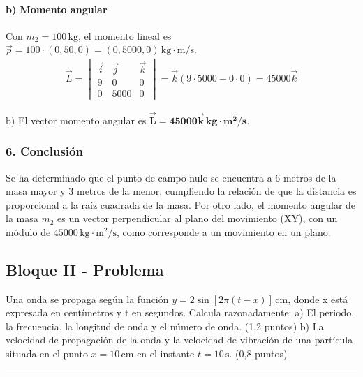 \paragraph{b) Momento angular}
Con $m_2=100\,\text{kg}$, el momento lineal es $\vec{p} = 100 \cdot (0,50,0) = (0, 5000, 0)\,\text{kg}\cdot\text{m/s}$.
\begin{gather}
    \vec{L} = \begin{vmatrix} \vec{i} & \vec{j} & \vec{k} \\ 9 & 0 & 0 \\ 0 & 5000 & 0 \end{vmatrix} = \vec{k}(9 \cdot 5000 - 0 \cdot 0) = 45000\vec{k}
\end{gather}
\begin{cajaresultado}
b) El vector momento angular es $\boldsymbol{\vec{L} = 45000\vec{k}\,\textbf{kg}\cdot\textbf{m}^2/\textbf{s}}$.
\end{cajaresultado}

\subsubsection*{6. Conclusión}
\begin{cajaconclusion}
Se ha determinado que el punto de campo nulo se encuentra a 6 metros de la masa mayor y 3 metros de la menor, cumpliendo la relación de que la distancia es proporcional a la raíz cuadrada de la masa. Por otro lado, el momento angular de la masa $m_2$ es un vector perpendicular al plano del movimiento (XY), con un módulo de $45000\,\text{kg}\cdot\text{m}^2/\text{s}$, como corresponde a un movimiento en un plano.
\end{cajaconclusion}

\newpage

\subsection{Bloque II - Problema}
\label{subsec:B2_2014_jul_ext}

\begin{cajaenunciado}
Una onda se propaga según la función $y=2\sin[2\pi(t-x)]\,\text{cm}$, donde x está expresada en centímetros y t en segundos. Calcula razonadamente:
a) El periodo, la frecuencia, la longitud de onda y el número de onda. (1,2 puntos) 
b) La velocidad de propagación de la onda y la velocidad de vibración de una partícula situada en el punto $x=10\,\text{cm}$ en el instante $t=10\,\text{s}$. (0,8 puntos) 
\end{cajaenunciado}
\hrule


